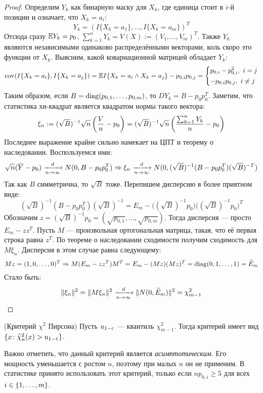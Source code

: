 \begin{proof}
	Определим $Y_k$ как бинарную маску для $X_k$, где единица стоит в $i$-й позиции и означает, что $X_k = a_i$:
	\[
		Y_k = (I\{X_k = a_1\}, \ldots, I\{X_k = a_m\})^T
	\]
	Отсюда сразу $\mathbb{E} Y_k = p_0$, $\sum_{k = 1}^n Y_k = V(X) := (V_1, \ldots, V_m)^T$. Также $Y_k$ являются независимыми одинаково распределёнными векторами, коль скоро это функции от $X_k$. Выясним, какой ковариационной матрицей обладает $Y_k$:
	\[
		\operatorname{cov}(I\{X_k = a_i\}, I\{X_k = a_j\}) = \mathbb{E} I\{X_k = a_i \wedge X_k = a_j\} - p_{0, i}p_{0, j} = \left\{\begin{aligned}
			&{p_{0, i} - p_{0, i}^2,\ i = j}
			\\
			&{-p_{0, i}p_{0, j},\ i \neq j}
		\end{aligned}\right.
	\]
	Таким образом, если $B = \operatorname{diag}(p_{0, 1}, \ldots, p_{0, m})$, то $D Y_k = B - p_0p_0^T$. Заметим, что статистика хи-квадрат является квадратом нормы такого вектора:
	\[
		\xi_n := (\sqrt{B})^{-1}\sqrt{n}\left(\frac{V}{n} - p_0\right) = (\sqrt{B})^{-1}\sqrt{n}\left(\frac{\sum_{k = 1}^n Y_k}{n} - p_0\right)
	\]
	Последнее выражение крайне сильно намекает на ЦПТ и теорему о наследовании. Воспользуемся ими:
	\[
		\sqrt{n}(\overline{Y} - p_0) \xrightarrow[n \to \infty]{d} N(0, B - p_0p_0^T) \Rightarrow \xi_n \xrightarrow[n \to \infty]{d} N(0, (\sqrt{B})^{-1}(B - p_0p_0^T)(\sqrt{B})^{-T})
	\]
	Так как $B$ симметрична, то $\sqrt{B}$ тоже. Перепишем дисперсию в более приятном виде:
	\[
		(\sqrt{B})^{-1}(B - p_0p_0^T)(\sqrt{B})^{-1} = E_m - \big((\sqrt{B})^{-1}p_0\big)\big((\sqrt{B})^{-1}p_0\big)^T
	\]
	Обозначим $z = (\sqrt{B})^{-1}p_0 = (\sqrt{p_{0, 1}}, \ldots, \sqrt{p_{0, m}})$. Тогда дисперсия --- просто $E_m - zz^T$. Пусть $M$ --- произвольная ортогональная матрица, такая, что её первая строка равна $z^T$. По теореме о наследовании сходимости получим сходимость для $M\xi_n$. Дисперсия в этом случае равна следующему:
	\[
		Mz = (1, 0, \ldots, 0)^T \Rightarrow M(E_m - zz^T)M^T = E_m - (Mz)(Mz)^T = \operatorname{diag}(0, 1, \ldots, 1) = \widetilde{E}_m
	\]
	Стало быть:
	\[
		\|\xi_n\|^2 = \|M\xi_n\|^2 \xrightarrow[n \to \infty]{d} \|N(0, \widetilde{E}_m)\|^2 = \chi_{m - 1}^2
	\]
\end{proof}

\begin{solution} (Критерий $\chi^2$ Пирсона)
	Пусть $u_{1 - \varepsilon}$ --- квантиль $\chi_{m - 1}^2$. Тогда критерий имеет вид $\{x \colon \widehat{\chi}_n^2(x) > u_{1 - \varepsilon}\}$.
\end{solution}

\begin{note}
	Важно отметить, что данный критерий является \textit{асимптотическим}. Его мощность уменьшается с ростом $n$, поэтому при малых $n$ он не применим. В статистике принято использовать этот критерий, только если $np_{0, i} \ge 5$ для всех $i \in \{1, \ldots, m\}$.
\end{note}

